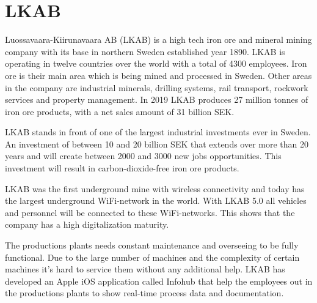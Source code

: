 \section{LKAB}
Luossavaara-Kiirunavaara AB (LKAB) is a high tech iron ore and mineral mining company with its base in northern Sweden established year 1890.
LKAB is operating in twelve countries over the world with a total of 4300 employees.
Iron ore is their main area which is being mined and processed in Sweden.
Other areas in the company are industrial minerals, drilling systems, rail transport, rockwork services and property management.
In 2019 LKAB produces 27 million tonnes of iron ore products, with a net sales amount of 31 billion SEK. \cite{LKABBrief} 

\bigskip

LKAB stands in front of one of the largest industrial investments ever in Sweden.
An investment of between 10 and 20 billion SEK that extends over more than 20 years and will create between 2000 and 3000 new jobs opportunities.
This investment will result in carbon-dioxide-free iron ore products. \cite{LKABInvestment}

\bigskip

LKAB was the first underground mine with wireless connectivity and today has the largest underground WiFi-network in the world.
With LKAB 5.0 all vehicles and personnel will be connected to these WiFi-networks.
This shows that the company has a high digitalization maturity. \cite{LKABITDevelopment}

\bigskip

The productions plants needs constant maintenance and overseeing to be fully functional.
Due to the large number of machines and the complexity of certain machines it's hard to service them without any additional help.
LKAB has developed an Apple iOS application called Infohub that help the employees out in the productions plants to show real-time process data and documentation.


